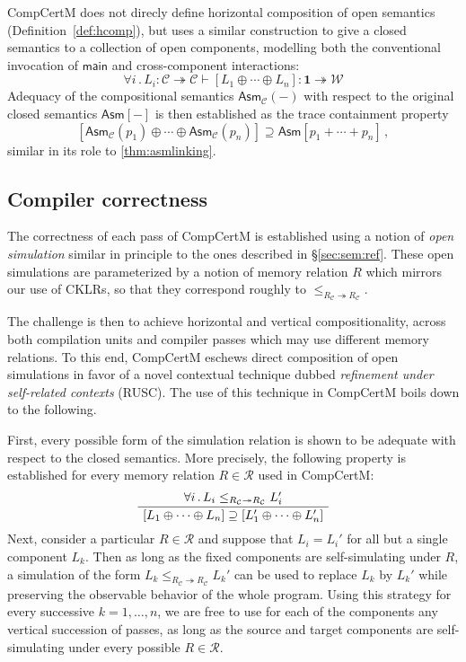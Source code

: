 \documentclass[sigplan,10pt,review]{acmart}
\newcommand{\kw}[1]{\ensuremath{ \mathsf{#1} }}
\begin{document}
CompCertM does not direcly define horizontal composition
of open semantics (Definition~\ref{def:hcomp}),
but uses a similar construction
to give a closed semantics to a collection of open components,
modelling both the conventional invocation of $\kw{main}$
and cross-component interactions:
\[
  \forall i \,.\,
  L_i : \mathcal{C} \twoheadrightarrow \mathcal{C} \vdash
  [L_1 \oplus \cdots \oplus L_n] : \mathbf{1} \twoheadrightarrow \mathcal{W}
\]
Adequacy of the compositional semantics $\kw{Asm}_\mathcal{C}(-)$
with respect to the original closed semantics $\kw{Asm}[-]$
is then established as the trace containment property
\begin{equation} \label{eqn:asmadeq}
  [\kw{Asm}_\mathcal{C}(p_1) \oplus \cdots \oplus \kw{Asm}_\mathcal{C}(p_n)] \supseteq
  \kw{Asm}[p_1 + \cdots + p_n]
  \,,
\end{equation}
similar in its role to \autoref{thm:asmlinking}.


\subsection{Compiler correctness} %

The correctness of each pass of CompCertM
is established using a notion of \emph{open simulation}
similar in principle to the ones described in \S\ref{sec:sem:ref}.
These open simulations
are parameterized by a notion of memory relation $R$
which mirrors our use of CKLRs,
so that they correspond roughly to
$\le_{R_\mathcal{C} \twoheadrightarrow R_\mathcal{C}}$.

The challenge is then to achieve
horizontal and vertical compositionality,
across both compilation units and compiler passes
which may use different memory relations.
To this end,
CompCertM eschews direct composition of open simulations
in favor of a novel contextual technique dubbed
\emph{refinement under self-related contexts} (RUSC).
The use of this technique in CompCertM boils down to the following.

First,
every possible form of the simulation relation
is shown to be adequate with respect to the closed semantics.
More precisely,
the following property is established
for every memory relation $R \in \mathcal{R}$
used in CompCertM:
\begin{equation} \label{eqn:simadeq}
  \AxiomC{$\forall i \,.\,
    L_i \le_{R_\mathcal{C} \twoheadrightarrow R_\mathcal{C}} L_i'$}
  \UnaryInfC{$
    [L_1  \oplus \cdots \oplus L_n] \supseteq
    [L_1' \oplus \cdots \oplus L_n']$}
  \DisplayProof
\end{equation}
Next,
consider a particular $R \in \mathcal{R}$
and suppose that $L_i = L_i'$
for all but a single component $L_k$.
Then
as long as the fixed components are self-simulating under $R$,
a simulation of the form
$L_k \le_{R_\mathcal{C} \twoheadrightarrow R_\mathcal{C}} L_k'$
can be used to replace $L_k$ by $L_k'$
while preserving the observable behavior of the whole program.
Using this strategy for every successive $k = 1, \ldots, n$,
we are free to use for each of the components
any vertical succession of passes,
as long as the source and target components
are self-simulating under every possible $R \in \mathcal{R}$.
\end{document}
